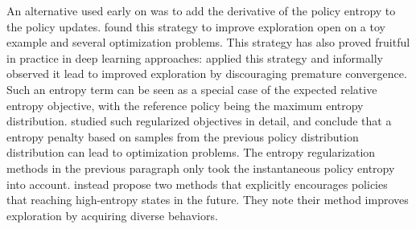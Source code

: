 An alternative used early on was to add the derivative of the policy entropy to the policy updates.  found this strategy to improve exploration open on a toy example and several optimization problems. This strategy has also proved fruitful in practice in deep learning approaches:   applied this strategy and informally observed it lead to improved exploration by discouraging premature convergence. Such an entropy term can be seen as a special case of the expected relative entropy objective, with the reference policy being the maximum entropy distribution.  studied such regularized objectives in detail, and conclude that a entropy penalty based on samples from the previous policy distribution distribution can lead to optimization problems.
The entropy regularization methods in the previous paragraph only took the instantaneous policy entropy into account.  instead propose two methods that explicitly encourages policies that reaching high-entropy states in the future. They note their method improves exploration by acquiring diverse behaviors.

